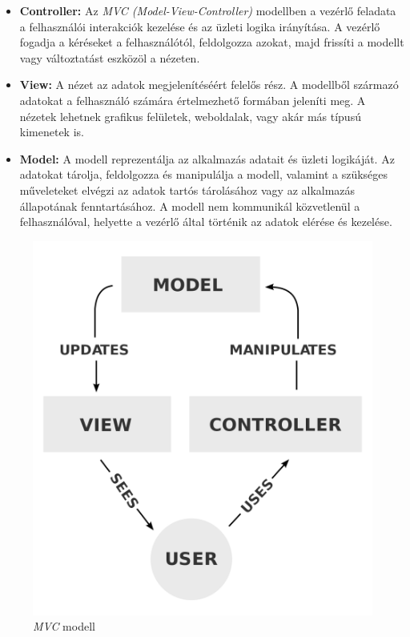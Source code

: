 \begin{itemize}
\item \textbf{Controller:} Az \textit{MVC (Model-View-Controller)} modellben a vezérlő feladata a felhasználói interakciók kezelése és az üzleti logika irányítása. A vezérlő fogadja a kéréseket a felhasználótól, feldolgozza azokat, majd frissíti a modellt vagy változtatást eszközöl a nézeten.
\item \textbf{View:} A nézet az adatok megjelenítéséért felelős rész. A modellből származó adatokat a felhasználó számára értelmezhető formában jeleníti meg. A nézetek lehetnek grafikus felületek, weboldalak, vagy akár más típusú kimenetek is.
\item \textbf{Model:} A modell reprezentálja az alkalmazás adatait és üzleti logikáját. Az adatokat tárolja, feldolgozza és manipulálja a modell, valamint a szükséges műveleteket elvégzi az adatok tartós tárolásához vagy az alkalmazás állapotának fenntartásához. A modell nem kommunikál közvetlenül a felhasználóval, helyette a vezérlő által történik az adatok elérése és kezelése.
\end{itemize}

\begin{figure}[h]
\centering
\includegraphics[scale=0.20]{images/MVC.png}
\caption{\textit{MVC} modell \cite{mvc}}
\label{fig:mvc}
\end{figure}

